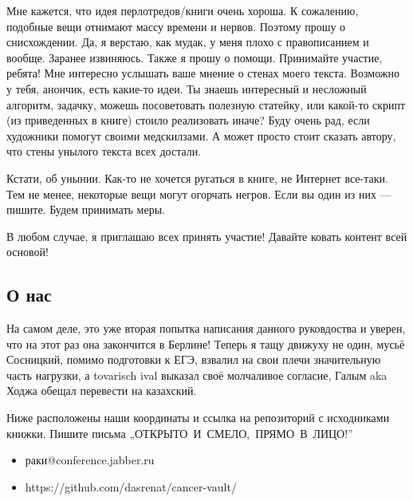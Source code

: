 Мне кажется, что идея перлотредов/книги очень хороша. К сожалению,
подобные вещи отнимают массу времени и нервов. Поэтому прошу о
снисхождении. Да, я верстаю, как мудак, у меня плохо с правописанием и вообще.
Заранее извиняюсь. Также я прошу о помощи. Принимайте участие, ребята!
Мне интересно услышать ваше мнение о стенах моего текста. Возможно
у тебя, анончик, есть какие-то идеи. Ты знаешь интересный и несложный
алгоритм, задачку, можешь посоветовать полезную статейку, или какой-то скрипт
(из приведенных в книге) стоило реализовать иначе? Буду очень рад,
если художники помогут своими медскилзами. А может просто стоит сказать
автору, что стены унылого текста всех достали.

Кстати, об унынии. Как-то не хочется ругаться в книге, не Интернет все-таки.
Тем не менее, некоторые вещи могут огорчать негров. Если вы один
из них — пишите. Будем принимать меры.

В любом случае, я приглашаю всех принять участие! Давайте ковать
контент всей основой!

\subsection{О нас}

На самом деле, это уже вторая попытка написания данного руковдоства и уверен,
что на этот раз она закончится в Берлине! Теперь я тащу движуху не один, мусьё
Сосницкий, помимо подготовки к ЕГЭ, взвалил на свои плечи значительную часть
нагрузки, а tovarisch ival выказал своё молчаливое согласие, Галым aka Ходжа
обещал перевести на казахский.

Ниже расположены наши координаты и ссылка на репозиторий с исходниками книжки.
Пишите письма \mbox{„ОТКРЫТО И СМЕЛО, ПРЯМО В ЛИЦО!”}

\begin{itemize}
\item раки@conference.jabber.ru
\item https://github.com/dasrenat/cancer-vault/
\end{itemize}


